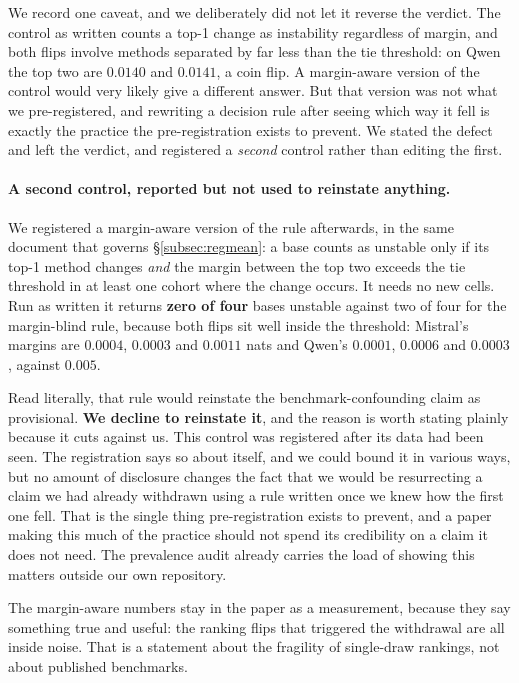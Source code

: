 We record one caveat, and we deliberately did not let it reverse the
verdict. The control as written counts a top-1 change as instability
regardless of margin, and both flips involve methods separated by far less
than the tie threshold: on Qwen the top two are $0.0140$ and $0.0141$, a
coin flip. A margin-aware version of the control would very likely give a
different answer. But that version was not what we pre-registered, and
rewriting a decision rule after seeing which way it fell is exactly the
practice the pre-registration exists to prevent. We stated the defect and
left the verdict, and registered a \emph{second} control rather than
editing the first.

\paragraph{A second control, reported but not used to reinstate anything.}
We registered a margin-aware version of the rule afterwards, in the same
document that governs \S\ref{subsec:regmean}: a base counts as unstable
only if its top-1 method changes \emph{and} the margin between the top two
exceeds the tie threshold in at least one cohort where the change occurs.
It needs no new cells. Run as written it returns \textbf{zero of four}
bases unstable against two of four for the margin-blind rule, because both
flips sit well inside the threshold: Mistral's margins are $0.0004$,
$0.0003$ and $0.0011$ nats and Qwen's $0.0001$, $0.0006$ and $0.0003$,
against $0.005$.

Read literally, that rule would reinstate the benchmark-confounding claim
as provisional. \textbf{We decline to reinstate it}, and the reason is
worth stating plainly because it cuts against us. This control was
registered after its data had been seen. The registration says so about
itself, and we could bound it in various ways, but no amount of disclosure
changes the fact that we would be resurrecting a claim we had already
withdrawn using a rule written once we knew how the first one fell. That
is the single thing pre-registration exists to prevent, and a paper making
this much of the practice should not spend its credibility on a claim it
does not need. The prevalence audit already carries the load of showing
this matters outside our own repository.

The margin-aware numbers stay in the paper as a measurement, because they
say something true and useful: the ranking flips that triggered the
withdrawal are all inside noise. That is a statement about the fragility of
single-draw rankings, not about published benchmarks.

